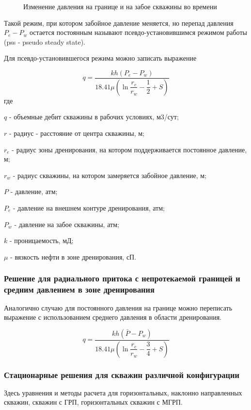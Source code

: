 \begin{figure}[h!]
	\begin{center}
		
		\caption{Изменение давления на границе и на забое скважины во времени}
		\label{ris:radial_pss_dynamics}
	\end{center}
\end{figure}

Такой режим, при котором забойное давление меняется, но перепад давления $P_e - P_w$ остается постоянным называют псевдо-установившимся режимом работы (pss - pseudo steady state). 

Для псевдо-установившегося режима можно записать выражение

$$q=\frac{kh\left(P_e-P_w\right)}{ 18.41 \mu\left(\ln{\dfrac{r_e}{r_w}} - \dfrac{1}{2} + S\right)}$$
где 

$q$ - объемные дебит скважины в рабочих условиях, м3/сут;

$r$ -  радиус - расстояние от центра скважины, м;

$r_e$ -  радиус зоны дренирования, на котором поддерживается постоянное давление, м;

$r_w$ - радиус скважины, на котором замеряется забойное давление, м;

$P$ - давление, атм;

$P_e$ - давление на внешнем контуре дренирования, атм;

$P_w$ - давление на забое скважины, атм;

$k$ - проницаемость, мД;

$\mu$ - вязкость нефти в зоне дренирования, сП.

\subsubsection{Решение для радиального притока с непротекаемой границей и средним давлением в зоне дренирования}

Аналогично случаю для постоянного давления на границе можно переписать выражение с использованием среднего давления в области дренирования. 

$$q=\frac{kh\left( \bar{P}-P_w\right)}{ 18.41 \mu\left(\ln{\dfrac{r_e}{r_w}} - \dfrac{3}{4}+ S \right)}$$




\subsubsection{Стационарные решения для скважин различной конфигурации}

Здесь уравнения и методы расчета для горизонтальных, наклонно направленных скважин, скважин с ГРП, горизонтальных скважин с МГРП. 


